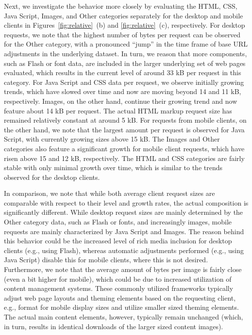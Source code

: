 Next, we investigate the behavior more closely by evaluating the HTML, CSS, Java Script, Images, and Other categories separately for the desktop and mobile clients in Figures~\ref{fig:relative}~(b) and \ref{fig:relative}~(c), respectively.
For desktop requests, we note that the highest number of bytes per request can be observed for the Other category, with a pronounced ``jump'' in the time frame of base URL adjustments in the underlying dataset. 
In turn, we reason that more components, such as Flash or font data, are included in the larger underlying set of web pages evaluated, which results in the current level of around 33 kB per request in this category.
For Java Script and CSS data per request, we observe  initially growing trends, which have slowed over time and now are moving beyond 14 and 11 kB, respectively.
Images, on the other hand, continue their growing trend and now feature about 14 kB per request.
The actual HTML markup request size has remained relatively constant at around 5 kB.
For requests from mobile clients, on the other hand, we note that the largest amount per request is observed for Java Script, with currently growing sizes above 15 kB.
The Images and Other categories also feature a significant growth for mobile client requests, which have risen above 15 and 12 kB, respectively.
The HTML and CSS categories are fairly stable with only minimal growth over time, which is similar to the trends observed for the desktop clients.

In comparison, we note that while both average client request sizes are comparable with respect to their level and growth rates, the actual composition is significantly different. 
While desktop request sizes are mainly determined by the Other category data, such as Flash or fonts, and increasingly images, mobile requests are mainly characterized by Java Script and Images.
The reason behind this behavior could be the increased level of rich media inclusion for desktop clients (e.g., using Flash), whereas automatic adjustments performed (e.g., using Java Script) disable this for mobile clients, where this is not desired. 
Furthermore, we note that the average amount of bytes per image is fairly close (even a bit higher for mobile), which could be due to increased utilization of content management systems.
These commonly utilized frameworks typically adjust web page layouts and theming elements based on the requesting client, e.g., format for mobile display sizes and utilize smaller sized theming elements. The actual main content elements, however, typically remain unchanged (which, in turn, results in identical downloads of the larger sized content images).


